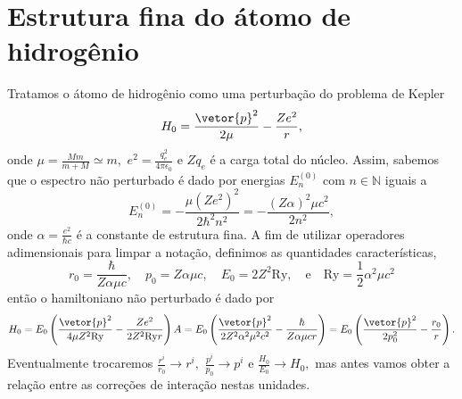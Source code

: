 \section{Estrutura fina do átomo de hidrogênio}
Tratamos o átomo de hidrogênio como uma perturbação do problema de Kepler
\begin{equation*}
   H_0 = \frac{\vetor{p}^2}{2\mu} - \frac{Ze^2}{r},
\end{equation*}
onde \(\mu = \frac{Mm}{m + M} \simeq m,\) \(e^2 = \frac{q_e^2}{4\pi \epsilon_0}\) e \(Z q_e\) é a carga total do núcleo. Assim, sabemos que o espectro não perturbado é dado por energias \(E^{(0)}_n\) com \(n \in \mathbb{N}\) iguais a
\begin{equation*}
   E^{(0)}_n = -\frac{\mu (Z e^2)^2}{2\hbar^2 n^2} = - \frac{(Z \alpha)^2 \mu c^2}{2n^2} ,
\end{equation*}
onde \(\alpha = \frac{e^2}{\hbar c}\) é a constante de estrutura fina. A fim de utilizar operadores adimensionais para limpar a notação, definimos as quantidades características,
\begin{equation*}
   r_0 = \frac{\hbar}{Z\alpha \mu c},\quad
   p_0 = Z \alpha \mu c,\quad
   E_0 = 2 Z^2 \mathrm{Ry},\quad\text{e}\quad
   \mathrm{Ry} = \frac12 \alpha^2 \mu c^2
\end{equation*}
então o hamiltoniano não perturbado é dado por
\begin{equation*}
   H_0 = E_0 \left(\frac{\vetor{p}^2}{4\mu Z^2 \mathrm{Ry}} - \frac{Z e^2}{2 Z^2 \mathrm{Ry} r}\right)A = E_0 \left(\frac{\vetor{p}^2}{2Z^2\alpha^2 \mu^2 c^2} - \frac{\hbar}{Z \alpha \mu c r}\right) = E_0 \left(\frac{\vetor{p}^2}{2p_0^2} - \frac{r_0}{r}\right).
\end{equation*}
Eventualmente trocaremos \(\frac{r^i}{r_0} \to r^i,\) \(\frac{p^i}{p_0} \to p^i\) e \(\frac{H_0}{E_0} \to H_0,\) mas antes vamos obter a relação entre as correções de interação nestas unidades.

